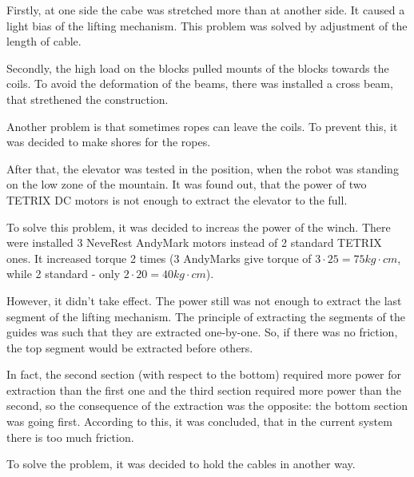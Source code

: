 \begin{enumerate*}
\begin{enumerate*}
  	\item Firstly, at one side the cabe was stretched more than at another side. It caused a light bias of the lifting mechanism. This problem was solved by adjustment of the length of cable.
  	
  	\item Secondly, the high load on the blocks pulled mounts of the blocks towards the coils. To avoid the deformation of the beams, there was installed a cross beam, that strethened the construction.
  	
  	\item Another problem is that sometimes ropes can leave the coils. To prevent this, it was decided to make shores for the ropes.
  	
  \end{enumerate*}

  \item After that, the elevator was tested in the position, when the robot was standing on the low zone of the mountain. It was found out, that the power of two TETRIX DC motors is not enough to extract the elevator to the full.

  To solve this problem, it was decided to increas the power of the winch. There were installed 3 NeveRest AndyMark motors instead of 2 standard TETRIX ones. It increased torque 2 times (3 AndyMarks give torque of $3 \cdot 25 = 75kg \cdot cm$, while 2 standard - only $2 \cdot 20 = 40kg \cdot cm$).

  However, it didn't take effect. The power still was not enough to extract the last segment of the lifting mechanism. The principle of extracting the segments of the guides was such that they are extracted one-by-one. So, if there was no friction, the top segment would be extracted before others.

  In fact, the second section (with respect to the bottom) required more power for extraction than the first one and the third section required more power than the second, so the consequence of the extraction was the opposite: the bottom section was going first. According to this, it was concluded, that in the current system there is too much friction.

  To solve the problem, it was decided to hold the cables in another way.


\end{enumerate*}
